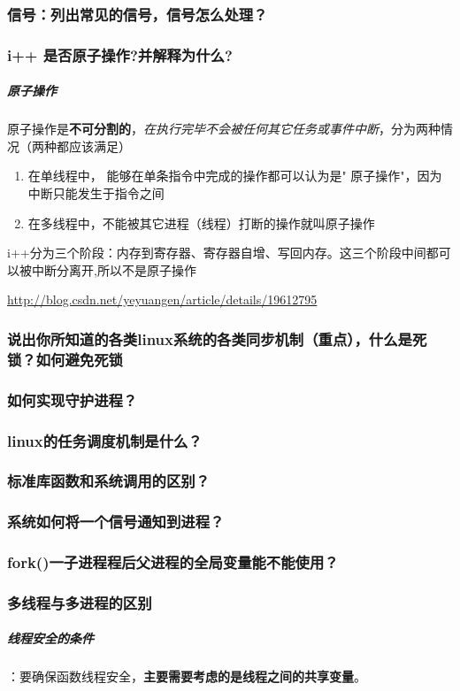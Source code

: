 \documentclass[UTF8,a4paper,8pt]{ctexart}
\begin{document}
		\subsubsection{信号：列出常见的信号，信号怎么处理？}
		\subsubsection{i++ 是否原子操作?并解释为什么?}
			\subparagraph{原子操作}原子操作是\textbf{不可分割的}，\textit{在执行完毕不会被任何其它任务或事件中断}，分为两种情况（两种都应该满足）
				\begin{enumerate}[itemindent = 2em]
					\item 在单线程中， 能够在单条指令中完成的操作都可以认为是" 原子操作"，因为中断只能发生于指令之间
					\item 在多线程中，不能被其它进程（线程）打断的操作就叫原子操作
				\end{enumerate}
			i++分为三个阶段：内存到寄存器、寄存器自增、写回内存。这三个阶段中间都可以被中断分离开,所以不是原子操作
			
			\url{http://blog.csdn.net/yeyuangen/article/details/19612795}
		\subsubsection{说出你所知道的各类linux系统的各类同步机制（重点），什么是死锁？如何避免死锁}
		\subsubsection{如何实现守护进程？}
		\subsubsection{linux的任务调度机制是什么？}
		\subsubsection{标准库函数和系统调用的区别？}
		\subsubsection{系统如何将一个信号通知到进程？}
		\subsubsection{fork()一子进程程后父进程的全局变量能不能使用？}
		\subsubsection{多线程与多进程的区别}
			\subparagraph{线程安全的条件}：要确保函数线程安全，\textbf{主要需要考虑的是线程之间的共享变量}。
			
\end{document}
